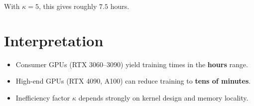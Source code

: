 \documentclass{article}
\begin{document}
With $\kappa = 5$, this gives roughly $7.5$ hours.

\section{Interpretation}
\begin{itemize}
    \item Consumer GPUs (RTX 3060–3090) yield training times in the \textbf{hours} range.
    \item High-end GPUs (RTX 4090, A100) can reduce training to \textbf{tens of minutes}.
    \item Inefficiency factor $\kappa$ depends strongly on kernel design and memory locality.
\end{itemize}
\end{document}
